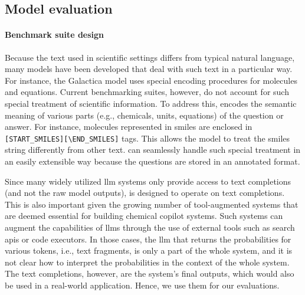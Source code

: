 \documentclass[11pt, oneside]{article}
\begin{document}
\begin{refsection}
\subsection{Model evaluation}

\paragraph{Benchmark suite design} Because the text used in scientific settings differs from typical natural language, many models have been developed that deal with such text in a particular way.
For instance, the Galactica model\autocite{taylor2022galactica} uses special encoding procedures for molecules and equations.
Current benchmarking suites, however, do not account for such special treatment of scientific information.
To address this, \chembench encodes the semantic meaning of various parts (e.g., chemicals, units, equations) of the question or answer.
For instance, molecules represented in \gls{smiles} are enclosed in \texttt{[START\_SMILES][\textbackslash END\_SMILES]} tags.
This allows the model to treat the \gls{smiles} string differently from other text.
\chembench can seamlessly handle such special treatment in an easily extensible way because the questions are stored in an annotated format.

Since many widely utilized \gls{llm} systems only provide access to text completions (and not the raw model outputs), \chembench is designed to operate on text completions.
This is also important given the growing number of tool-augmented systems that are deemed essential for building chemical copilot systems.
Such systems can augment the capabilities of \glspl{llm} through the use of external tools such as search \glspl{api} or code executors.\autocite{schick2024toolformer, karpas2022mrkl, yao2022react}
In those cases, the \gls{llm} that returns the probabilities for various tokens, i.e., text fragments, is only a part of the whole system, and it is not clear how to interpret the probabilities in the context of the whole system.
The text completions, however, are the system's final outputs, which would also be used in a real-world application.
Hence, we use them for our evaluations.\autocite{xiong2023llms}


\end{refsection}
\end{document}
